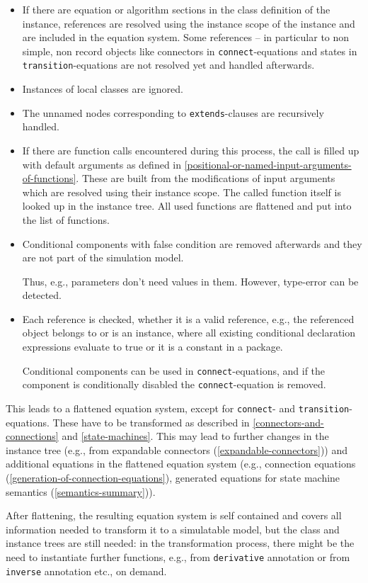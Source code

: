 \begin{itemize}
\begin{itemize}
  \end{itemize}
\item
  If there are equation or algorithm sections in the class definition of the instance, references are resolved using the instance scope of the instance and are included in the equation system.
  Some references -- in particular to non simple, non record objects like connectors in \lstinline!connect!-equations and states in \lstinline!transition!-equations are not resolved yet and handled afterwards.
\item
  Instances of local classes are ignored.
\item
  The unnamed nodes corresponding to \lstinline!extends!-clauses are recursively handled.
\item
  If there are function calls encountered during this process, the call is filled up with default arguments as defined in \cref{positional-or-named-input-arguments-of-functions}.
  These are built from the modifications of input arguments which are resolved using their instance scope.
  The called function itself is looked up in the instance tree.
  All used functions are flattened and put into the list of functions.
\item
  Conditional components with false condition are removed afterwards and they are not part of the simulation model.
  \begin{nonnormative}
  Thus, e.g., parameters don't need values in them.
  However, type-error can be detected.
  \end{nonnormative}
\item
  Each reference is checked, whether it is a valid reference, e.g., the referenced object belongs to or is an instance, where all existing conditional declaration expressions evaluate to true or it is a constant in a package.
  \begin{nonnormative}
  Conditional components can be used in \lstinline!connect!-equations, and if the component is conditionally disabled the \lstinline!connect!-equation is removed.
  \end{nonnormative}
\end{itemize}

This leads to a flattened equation system, except for \lstinline!connect!- and \lstinline!transition!-equations.
These have to be transformed as described in \cref{connectors-and-connections} and \cref{state-machines}.
This may lead to further changes in the instance tree (e.g., from expandable connectors (\cref{expandable-connectors})) and additional equations in the flattened equation system (e.g., connection equations (\cref{generation-of-connection-equations}), generated equations for state machine semantics (\cref{semantics-summary})).

\begin{nonnormative}
After flattening, the resulting equation system is self contained and covers all information needed to transform it to a simulatable model, but the class and instance trees are still needed: in the transformation process, there might be the need to instantiate further functions, e.g., from \lstinline!derivative! annotation or from \lstinline!inverse! annotation etc., on demand.
\end{nonnormative}
